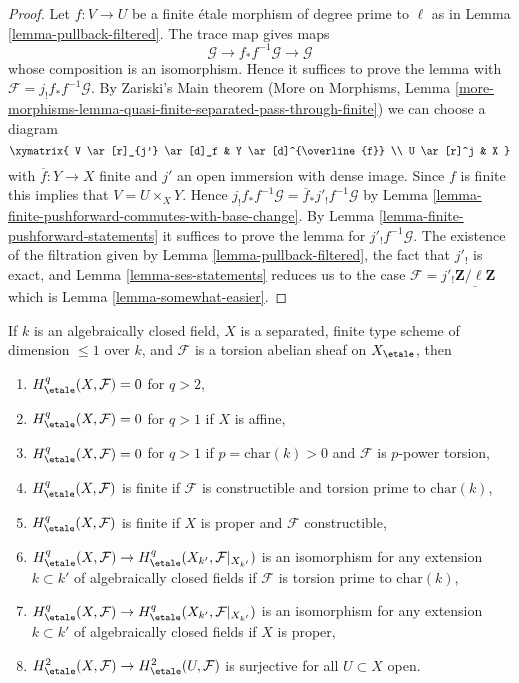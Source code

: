 \begin{proof}
Let $f : V \to U$ be a finite \'etale morphism of degree prime to $\ell$
as in Lemma \ref{lemma-pullback-filtered}. The trace map gives
maps
$$
\mathcal{G} \to f_*f^{-1}\mathcal{G} \to \mathcal{G}
$$
whose composition is an isomorphism. Hence it suffices to prove the
lemma with $\mathcal{F} = j_!f_*f^{-1}\mathcal{G}$.
By Zariski's Main theorem
(More on Morphisms, Lemma
\ref{more-morphisms-lemma-quasi-finite-separated-pass-through-finite})
we can choose a diagram
$$
\xymatrix{
V \ar[r]_{j'} \ar[d]_f & Y \ar[d]^{\overline{f}} \\
U \ar[r]^j & X
}
$$
with $\overline{f} : Y \to X$ finite and $j'$ an open immersion
with dense image. Since $f$ is finite this implies that
$V = U \times_X Y$. Hence
$j_!f_*f^{-1}\mathcal{G} = \overline{f}_*j'_!f^{-1}\mathcal{G}$ by
Lemma \ref{lemma-finite-pushforward-commutes-with-base-change}.
By Lemma \ref{lemma-finite-pushforward-statements} it suffices to
prove the lemma for $j'_!f^{-1}\mathcal{G}$.
The existence of the filtration given by
Lemma \ref{lemma-pullback-filtered},
the fact that $j'_!$ is exact, and
Lemma \ref{lemma-ses-statements}
reduces us to the case
$\mathcal{F} = j'_!\underline{\mathbf{Z}/\ell\mathbf{Z}}$
which is Lemma \ref{lemma-somewhat-easier}.
\end{proof}



\begin{theorem}
\label{theorem-vanishing-affine-curves}
If $k$ is an algebraically closed field, $X$ is a separated, finite type
scheme of dimension $\leq 1$ over $k$, and $\mathcal{F}$ is a torsion
abelian sheaf on $X_\etale$, then
\begin{enumerate}
\item
$H^q_\etale(X, \mathcal{F}) = 0$ for $q > 2$,
\item
$H^q_\etale(X, \mathcal{F}) = 0$ for $q > 1$ if $X$ is affine,
\item
$H^q_\etale(X, \mathcal{F}) = 0$ for $q > 1$ if $p = \text{char}(k) > 0$
and $\mathcal{F}$ is $p$-power torsion,
\item
$H^q_\etale(X, \mathcal{F})$ is finite if $\mathcal{F}$ is
constructible and torsion prime to $\text{char}(k)$,
\item
$H^q_\etale(X, \mathcal{F})$ is finite if $X$ is proper and
$\mathcal{F}$ constructible,
\item
$H^q_\etale(X, \mathcal{F}) \to
H^q_\etale(X_{k'}, \mathcal{F}|_{X_{k'}})$ is an isomorphism
for any extension $k \subset k'$ of algebraically closed fields
if $\mathcal{F}$ is torsion prime to $\text{char}(k)$,
\item
$H^q_\etale(X, \mathcal{F}) \to
H^q_\etale(X_{k'}, \mathcal{F}|_{X_{k'}})$ is an isomorphism
for any extension $k \subset k'$ of algebraically closed fields
if $X$ is proper,
\item
$H^2_\etale(X, \mathcal{F}) \to H^2_\etale(U, \mathcal{F})$
is surjective for all $U \subset X$ open.
\end{enumerate}
\end{theorem}


